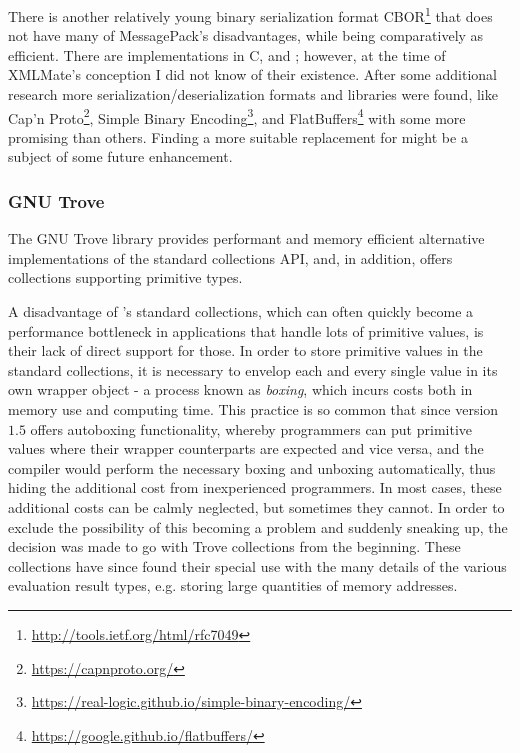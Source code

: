 There is another relatively young binary serialization format
{\small CBOR}\footnote{\url{http://tools.ietf.org/html/rfc7049}} that does not have many of {\small
MessagePack's} disadvantages, while being comparatively as efficient.
There are implementations in {\small C}, \python and \java; however, at the time of {\small XMLMate's}
conception I did not know of their existence. 
After some additional research more serialization/deserialization formats and libraries were found, like
{\small Cap'n Proto}\footnote{\url{https://capnproto.org/}},
{\small Simple Binary Encoding}\footnote{\url{https://real-logic.github.io/simple-binary-encoding/}}, and
{\small FlatBuffers}\footnote{\url{https://google.github.io/flatbuffers/}} with some more promising than
others. Finding a more suitable replacement for \msgpack might be a subject of some future enhancement.
\tocless\subsubsection{GNU Trove}
\label{sec:trove}
The GNU Trove \java library provides performant and memory efficient alternative implementations of the
standard \java collections API, and, in addition, offers collections supporting primitive types. 

A disadvantage of \java's standard collections, which can often quickly become a performance bottleneck in
applications that handle lots of primitive values, is their lack of direct support for those. In
order to store primitive values in the standard collections, it is necessary to envelop each and every single
value in its own wrapper object - a process known as \emph{boxing}, which incurs costs both in memory use and
computing time. This practice is so common that since version $1.5$ \java offers autoboxing functionality,
whereby programmers can put primitive values where their wrapper counterparts are expected and vice versa, and
the \java compiler would perform the necessary boxing and unboxing automatically, thus hiding the additional
cost from inexperienced programmers. In most cases, these additional costs can be calmly neglected, but
sometimes they cannot. In order to exclude the possibility of this becoming a problem and suddenly sneaking
up, the decision was made to go with Trove collections from the beginning. These collections have since found
their special use with the many details of the various evaluation result types, e.g. storing large quantities
of memory addresses.